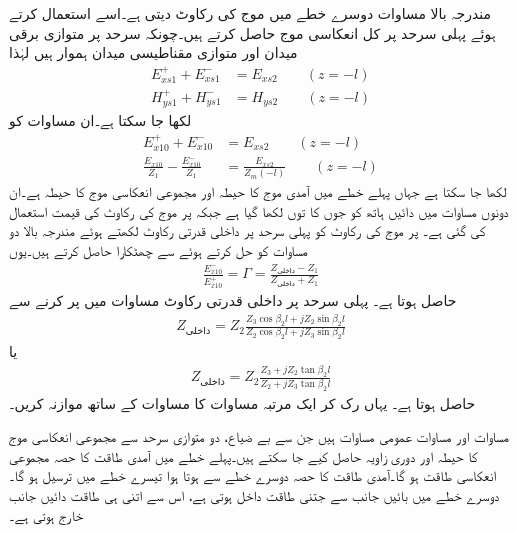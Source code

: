 مندرجہ بالا مساوات دوسرے خطے میں موج کی رکاوٹ دیتی ہے۔اسے استعمال کرتے ہوئے پہلی سرحد پر کل انعکاسی موج حاصل کرتے ہیں۔چونکہ سرحد پر متوازی برقی میدان  اور متوازی مقناطیسی میدان  ہموار ہیں لہٰذا
\begin{align}
E_{xs1}^++E_{xs1}^-&=E_{xs2} \quad \quad (z=-l)\\
H_{ys1}^++H_{ys1}^-&=H_{ys2} \quad \quad (z=-l)
\end{align}
لکھا جا سکتا ہے۔ان مساوات کو
\begin{align}
E_{x10}^+ + E_{x10}^- &=E_{xs2} \quad \quad (z=-l)\\
\frac{E_{x10}}{Z_1}-\frac{E_{x10}^-}{Z_1}&=\frac{E_{xs2}}{Z_m(-l)} \quad \quad (z=-l)
\end{align}
لکھا جا سکتا ہے جہاں پہلے خطے میں آمدی موج کا حیطہ  اور مجموعی انعکاسی موج کا حیطہ  ہے۔ان دونوں مساوات میں دائیں ہاتھ  کو جوں کا توں لکھا گیا ہے جبکہ  پر موج کی رکاوٹ کی قیمت  استعمال کی گئی ہے۔  پر موج کی رکاوٹ کو پہلی سرحد پر داخلی قدرتی رکاوٹ  لکھتے ہوئے مندرجہ بالا دو مساوات کو حل کرتے ہوئے  سے چھٹکارا حاصل کرتے ہیں۔یوں
\begin{align}\label{مساوات_مستوی_شرح_انعکاس_دو_سرحدی}
\frac{E_{x10}^-}{E_{x10}^+}=\Gamma=\frac{Z_{\text{داخلی}}-Z_1}{Z_{\text{داخلی}}+Z_1}
\end{align}
حاصل ہوتا ہے۔ پہلی سرحد پر داخلی قدرتی رکاوٹ مساوات  میں  پر کرنے سے
\begin{align}\label{مساوات_مستوی_داخلی_رکاوٹ_دو_سرحدی}
Z_{\text{داخلی}}= Z_2 \frac{Z_3 \cos \beta_2 l +j Z_2 \sin \beta_2 l}{Z_2 \cos \beta_2 l +j Z_3\sin \beta_2 l}
\end{align}
یا
\begin{align}\label{مساوات_مستوی_داخلی_رکاوٹ_دو_سرحدی_ب}
Z_{\text{داخلی}}= Z_2 \frac{Z_3  +j Z_2 \tan \beta_2 l}{Z_2  +j Z_3\tan \beta_2 l}
\end{align}
حاصل ہوتا ہے۔  یہاں رک کر ایک مرتبہ مساوات  کا مساوات  کے ساتھ موازنہ کریں۔

مساوات  اور مساوات  عمومی مساوات ہیں جن سے  بے ضیاع، دو متوازی سرحد سے  مجموعی انعکاسی موج کا حیطہ اور دوری زاویہ حاصل کیے جا سکتے ہیں۔پہلے خطے میں آمدی طاقت کا   حصہ مجموعی انعکاسی طاقت ہو گا۔آمدی طاقت کا  حصہ دوسرے خطے سے ہوتا ہوا تیسرے خطے میں ترسیل ہو گا۔دوسرے خطے میں بائیں جانب سے جتنی طاقت داخل ہوتی ہے، اس سے اتنی ہی طاقت دائیں جانب خارج ہوتی ہے۔

